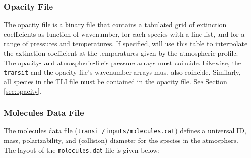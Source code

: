 \documentclass[letterpaper, 12pt]{article}
\begin{document}
\subsubsection{Opacity File}
\label{sec:opac-file}

The opacity file is a binary file that contains a tabulated grid of
extinction coefficients as function of wavenumber, for each species
with a line list, and for a range of pressures and temperatures.  If
specified, {\transit} will use this table to interpolate the
extinction coefficient at the temperatures given by the atmospheric
profile.  The opacity- and atmospheric-file's pressure arrays must
coincide.  Likewise, the {\tt transit} and the opacity-file's
wavenumber arrays must also coincide.  Similarly, all species in the
TLI file must be contained in the opacity file.  See Section
\ref{sec:opacity}.


\subsubsection{Molecules Data File}

The molecules data file ({\tt transit/inputs/molecules.dat})
defines a universal ID, mass, polarizability, and (collision) diameter for the
species in the atmosphere.
The layout of the {\tt molecules.dat} file is given below: \newline
\end{document}

